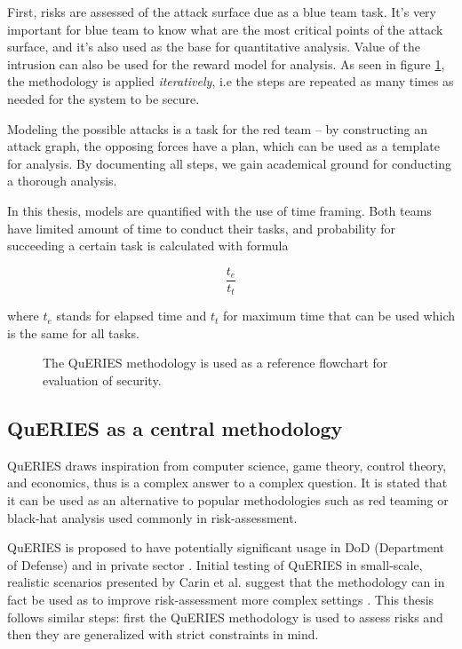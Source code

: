 First, risks are assessed of the attack surface due as a blue team
task. It's very important for blue team to know what are the most
critical points of the attack surface, and it's also used as the base
for quantitative analysis. Value of the intrusion can also be used for
the reward model for analysis. As seen in figure \ref{queries},
the methodology is applied \textit{iteratively}, i.e the steps are
repeated as many times as needed for the system to be secure.

Modeling the possible attacks is a task for the red team – by
constructing an attack graph, the opposing forces have a plan, which
can be used as a template for analysis. By documenting all steps, we
gain academical ground for conducting a thorough analysis.

In this thesis, models are quantified with the use of time
framing. Both teams have limited amount of time to conduct their
tasks, and probability for succeeding a certain task is calculated
with formula

\[ \frac{t_e}{t_t} \]

where \(t_e\) stands for elapsed time and \(t_t\) for maximum time
that can be used which is the same for all tasks.

\begin{figure}[t!]
\centerline{}
\caption{The QuERIES methodology is used as a reference flowchart for
  evaluation of security. \cite{hughes2013quantitative}}
\label{queries}
\end{figure}
\subsection{QuERIES as a central methodology}

QuERIES draws inspiration from computer science, game theory, control
theory, and economics, thus is a complex answer to a complex
question. It is stated that it can be used as an alternative to
popular methodologies such as red teaming or black-hat analysis used
commonly in risk-assessment. \cite{carin2008cybersecurity}

QuERIES is proposed to have potentially significant usage in DoD
(Department of Defense) and in private sector
\cite{carin2008cybersecurity}. Initial testing of QuERIES in
small-scale, realistic scenarios presented by Carin et al. suggest
that the methodology can in fact be used as to improve risk-assessment
more complex settings \cite{carin2008cybersecurity}. This thesis
follows similar steps: first the QuERIES methodology is used to assess
risks and then they are generalized with strict constraints in mind.

